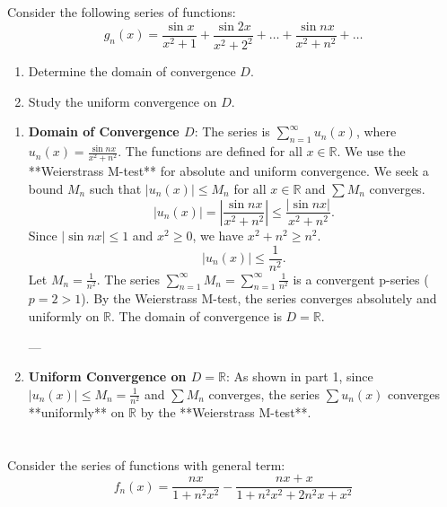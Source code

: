 \documentclass[12pt]{article}
\begin{document}
\section{}
Consider the following series of functions: 
$$g_n(x) = \frac{\sin x}{x^2+1} + \frac{\sin 2x}{x^2+2^2} + \ldots + \frac{\sin nx}{x^2+n^2} + \ldots$$

\begin{enumerate}
    \item Determine the domain of convergence $D$.
    \item Study the uniform convergence on $D$.
\end{enumerate}

\begin{correctionbox}
\begin{enumerate}
    \item \textbf{Domain of Convergence $D$}:
    The series is $\sum_{n=1}^\infty u_n(x)$, where $u_n(x) = \frac{\sin nx}{x^2+n^2}$. The functions are defined for all $x \in \mathbb{R}$.
    We use the **Weierstrass M-test** for absolute and uniform convergence.
    We seek a bound $M_n$ such that $|u_n(x)| \leq M_n$ for all $x \in \mathbb{R}$ and $\sum M_n$ converges.
    $$ |u_n(x)| = \left|\frac{\sin nx}{x^2+n^2}\right| \leq \frac{|\sin nx|}{x^2+n^2}. $$
    Since $|\sin nx| \leq 1$ and $x^2 \geq 0$, we have $x^2+n^2 \geq n^2$.
    $$ |u_n(x)| \leq \frac{1}{n^2}. $$
    Let $M_n = \frac{1}{n^2}$. The series $\sum_{n=1}^\infty M_n = \sum_{n=1}^\infty \frac{1}{n^2}$ is a convergent p-series ($p=2 > 1$).
    By the Weierstrass M-test, the series converges absolutely and uniformly on $\mathbb{R}$.
    The domain of convergence is $D = \mathbb{R}$.

    ---

    \item \textbf{Uniform Convergence on $D = \mathbb{R}$}:
    As shown in part 1, since $|u_n(x)| \leq M_n = \frac{1}{n^2}$ and $\sum M_n$ converges, the series $\sum u_n(x)$ converges **uniformly** on $\mathbb{R}$ by the **Weierstrass M-test**.
\end{enumerate}
\end{correctionbox}

\section{}
Consider the series of functions with general term: 
$$f_n(x) = \frac{nx}{1+n^2x^2} - \frac{nx+x}{1+n^2x^2+2n^2x+x^2}$$
\end{document}
